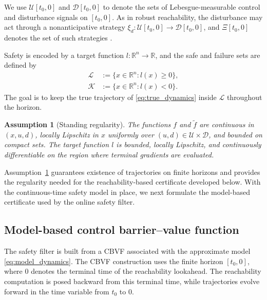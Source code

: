 \documentclass[letterpaper,10pt,conference]{ieeeconf}
\newtheorem{assumption}{Assumption}
\newcommand{\R}{\mathbb{R}}
\newcommand{\fapp}{\widetilde{f}}
\newcommand{\safe}{\mathcal{L}}
\newcommand{\fail}{\mathcal{K}}
\newcommand{\xv}{x}
\newcommand{\uv}{u}
\newcommand{\dv}{d}
\newcommand{\Uv}{\mathcal{U}}
\newcommand{\Dv}{\mathcal{D}}
\newcommand{\Xiv}{\Xi}
\begin{document}
We use $\Uv[t_0,0]$ and $\Dv[t_0,0]$ to denote the sets of Lebesgue-measurable
control and disturbance signals on $[t_0,0]$. As in robust reachability, the
disturbance may act through a nonanticipative strategy
$\xi_{\dv}:\Uv[t_0,0]\to\Dv[t_0,0]$, and $\Xiv[t_0,0]$ denotes the set of such
strategies \cite{choi2021cbvf,mitchell2005time}.

Safety is encoded by a target function $l:\R^n\to\R$, and the safe and failure
sets are defined by
\begin{equation}
\begin{aligned}
    \safe &:= \{\xv\in\R^n : l(\xv)\ge 0\},\\
    \fail &:= \{\xv\in\R^n : l(\xv)<0\}.
\end{aligned}
\label{eq:safe_failure_sets}
\end{equation}
The goal is to keep the true trajectory of \eqref{eq:true_dynamics} inside
$\safe$ throughout the horizon.

\begin{assumption}[Standing regularity]
\label{ass:regularity}
The functions $f$ and $\fapp$ are continuous in $(\xv,\uv,\dv)$, locally
Lipschitz in $\xv$ uniformly over $(\uv,\dv)\in\Uv\times\Dv$, and bounded on
compact sets. The target function $l$ is bounded, locally Lipschitz, and
continuously differentiable on the region where terminal gradients are
evaluated.
\end{assumption}

Assumption~\ref{ass:regularity} guarantees existence of trajectories on finite
horizons and provides the regularity needed for the reachability-based
certificate developed below. With the continuous-time safety model in place, we
next formulate the model-based certificate used by the online safety filter.




\subsection{Model-based control barrier--value function}

The safety filter is built from a CBVF
associated with the approximate model \eqref{eq:model_dynamics}. The CBVF
construction uses the finite horizon $[t_0,0]$, where $0$ denotes the terminal
time of the reachability lookahead. The reachability computation is posed
backward from this terminal time, while trajectories evolve forward in the time
variable from $t_0$ to $0$.
\end{document}
